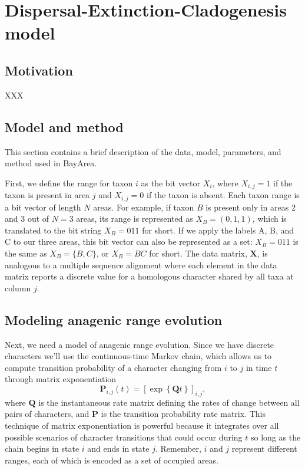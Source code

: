 \section{Dispersal-Extinction-Cladogenesis model}

\subsection{Motivation}

XXX

\subsection{Model and method}

This section contains a brief description of the data, model, parameters, and method used in BayArea.

First, we define the range for taxon $i$ as the bit vector $X_i$, where $X_{i,j} = 1$ if the taxon is present in area $j$ and $X_{i,j} = 0$ if the taxon is absent.
Each taxon range is a bit vector of length $N$ areas.
For example, if taxon $B$ is present only in areas 2 and 3 out of $N=3$ areas, its range is represented as $X_B = (0,1,1)$, which is translated to the bit string $X_B=011$ for short.
If we apply the labels A, B, and C to our three areas, this bit vector can also be represented as a set: $X_B=011$ is the same as $X_B = \{ B, C \}$, or $X_B=BC$ for short.
The data matrix, $\textbf{X}$, is analogous to a multiple sequence alignment where each element in the data matrix reports a discrete value for a homologous character shared by all taxa at column $j$.

\subsection{Modeling anagenic range evolution}

Next, we need a model of anagenic range evolution.
Since we have discrete characters we'll use the continuous-time Markov chain, which allows us to compute transition probability of a character changing from $i$ to $j$ in time $t$ through matrix exponentiation
\[
\mathbf{P}_{i,j}(t) = \left[ \exp \left\lbrace \mathbf{Q}t \right\rbrace \right]_{i,j},
\]
where $\textbf{Q}$ is the instantaneous rate matrix defining the rates of change between all pairs of characters, and $\textbf{P}$ is the transition probability rate matrix.
This technique of matrix exponentiation is powerful because it integrates over all possible scenarios of character transitions that could occur during $t$ so long as the chain begins in state $i$ and ends in state $j$. Remember, $i$ and $j$ represent different ranges, each of which is encoded as a set of occupied areas.

